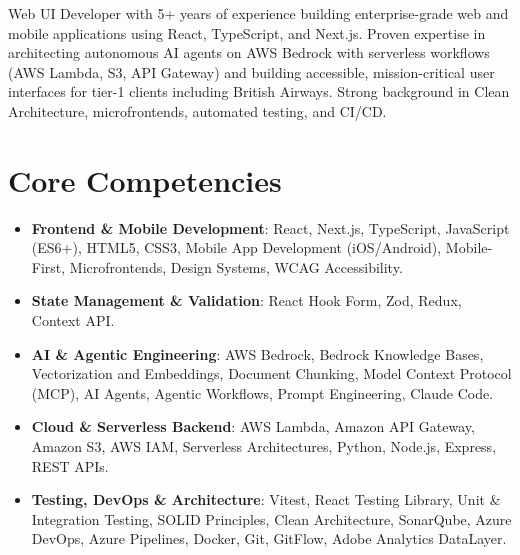 \documentclass[11pt,a4paper,sans]{moderncv}
\begin{document}
\makecvtitle


\vspace{4pt}
\small{Web UI Developer with 5+ years of experience building enterprise-grade web and mobile applications using React, TypeScript, and Next.js. Proven expertise in architecting autonomous AI agents on AWS Bedrock with serverless workflows (AWS Lambda, S3, API Gateway) and building accessible, mission-critical user interfaces for tier-1 clients including British Airways. Strong background in Clean Architecture, microfrontends, automated testing, and CI/CD.}


\section{Core Competencies}
\vspace{1pt}
\begin{itemize}

\item \textbf{Frontend \& Mobile Development}: React, Next.js, TypeScript, JavaScript (ES6+), HTML5, CSS3, Mobile App Development (iOS/Android), Mobile-First, Microfrontends, Design Systems, WCAG Accessibility.

\item \textbf{State Management \& Validation}: React Hook Form, Zod, Redux, Context API.

\item \textbf{AI \& Agentic Engineering}: AWS Bedrock, Bedrock Knowledge Bases, Vectorization and Embeddings, Document Chunking, Model Context Protocol (MCP), AI Agents, Agentic Workflows, Prompt Engineering, Claude Code.

\item \textbf{Cloud \& Serverless Backend}: AWS Lambda, Amazon API Gateway, Amazon S3, AWS IAM, Serverless Architectures, Python, Node.js, Express, REST APIs.

\item \textbf{Testing, DevOps \& Architecture}: Vitest, React Testing Library, Unit \& Integration Testing, SOLID Principles, Clean Architecture, SonarQube, Azure DevOps, Azure Pipelines, Docker, Git, GitFlow, Adobe Analytics DataLayer.

\end{itemize}
\end{document}
